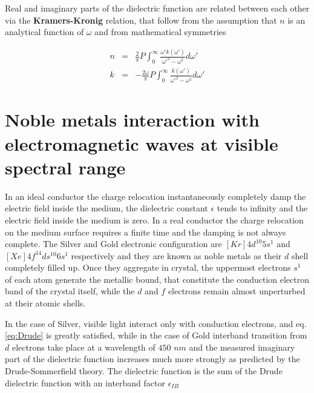 
Real and imaginary parts of the dielectric function are related between each other via the {\bf Kramers-Kronig} relation, that follow from the assumption that $n$ is an analytical function of $\omega$ and from mathematical symmetries

\begin{eqnarray}
	n & = & \frac{2}{\pi}P\int_0^{\infty} \frac{\omega ' k( \omega ' )}{ \omega '^2 - \omega ^2 }d\omega '\\
	k & = & - \frac{2\omega}{\pi}P\int_0^{\infty} \frac{ k(\omega ') }{ \omega '^2 - \omega ^2 }d\omega '
\end{eqnarray}






\section{Noble metals interaction with electromagnetic waves at visible spectral range}



In an ideal conductor the charge relocation instantaneously completely damp the electric field inside the medium, the dielectric constant $\epsilon$ tends to infinity and the electric field inside the medium is zero.
In a real conductor the charge relocation on the medium surface requires a finite time and the damping is not always complete.
The Silver and Gold electronic configuration are $[Kr]4d^{10}5s^{1} $ and  $[Xe]4f^{14}ds^{10}6s^1 $ respectively and they are known as noble metals as their $d$ shell completely filled up. Once they aggregate in crystal, the uppermost electrons $s^1$ of  each atom generate the metallic bound, that constitute the conduction electron band of the crystal itself, while the $d$ and $f$ electrons remain almost unperturbed at their atomic shells. 



In the case of Silver, visible light interact only with conduction electrons, and eq. \ref{eq:Drude} is greatly satisfied, while in the case of Gold interband transition from $d$ electrons take place at a wavelength of $450$ $nm$ and the measured imaginary part of the dielectric function increases much more strongly as predicted by the Drude-Sommerfield theory. The dielectric function is the sum of the Drude dielectric function with an interband factor $\epsilon_{IB}$ \cite{link1999}

